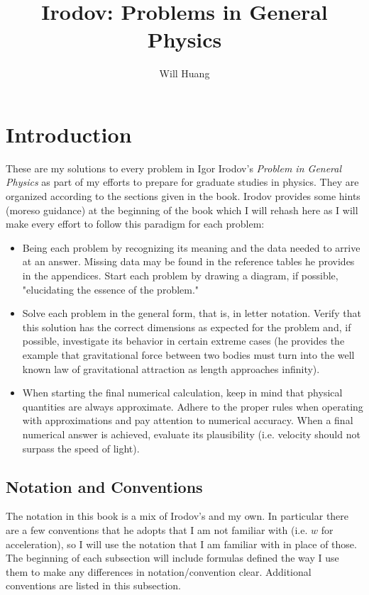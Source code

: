 \documentclass[12pt]{article}
\begin{document}
\title{Irodov: Problems in General Physics}
\author{Will Huang}
\maketitle
\tableofcontents

\newpage 

\section{Introduction}
These are my solutions to every problem in Igor Irodov's \emph{Problem in General Physics} as part of my efforts to prepare for graduate studies in physics. They are organized according to the sections given in the book. Irodov provides some hints (moreso guidance) at the beginning of the book which I will rehash here as I will make every effort to follow this paradigm for each problem:
\begin{itemize}
	\item Being each problem by recognizing its meaning and the data needed to arrive at an answer. Missing data may be found in the reference tables he provides in the appendices. Start each problem by drawing a diagram, if possible, "elucidating the essence of the problem."
	\item Solve each problem in the general form, that is, in letter notation. Verify that this solution has the correct dimensions as expected for the problem and, if possible, investigate its behavior in certain extreme cases (he provides the example that gravitational force between two bodies must turn into the well known law of gravitational attraction as length approaches infinity).
	\item When starting the final numerical calculation, keep in mind that physical quantities are always approximate. Adhere to the proper rules when operating with approximations and pay attention to numerical accuracy. When a final numerical answer is achieved, evaluate its plausibility (i.e. velocity should not surpass the speed of light).
\end{itemize}

\subsection{Notation and Conventions}
The notation in this book is a mix of Irodov's and my own. In particular there are a few conventions that he adopts that I am not familiar with (i.e. $w$ for acceleration), so I will use the notation that I am familiar with in place of those. The beginning of each subsection will include formulas defined the way I use them to make any differences in notation/convention clear. Additional conventions are listed in this subsection. 
\end{document}

